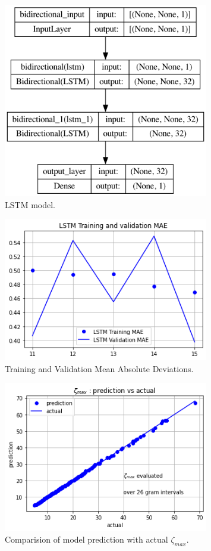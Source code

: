 \documentclass[twoside]{article}
\begin{document}
\begin{figure}
\centering
\includegraphics[width=0.8\textwidth]{2.png}
\caption[]{ 
  LSTM model. 
  }
\vspace{1mm}
\label{z2}
\end{figure}

\begin{figure}
\centering
\includegraphics[width=0.8\textwidth]{3.png}
\caption[]{ 
  Training and Validation Mean Absolute Deviations.
  }
\vspace{1mm}
\label{z3}
\end{figure}

\begin{figure}
\centering
\includegraphics[width=0.8\textwidth]{4.png}
\caption[]{ 
  Comparision of model prediction with actual $\zeta_{max}$. 
  }
\vspace{1mm}
\label{z4}
\end{figure}
\end{document}
